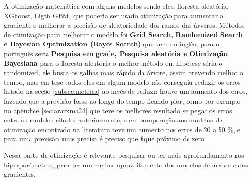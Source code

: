 A otimização matemática com alguns modelos sendo eles, floresta aleatória, XGboost, Ligth GBM, que poderia ser usado otimização para aumentar o gradiente e melhorar a precisão de aleatoriedade dos ramos das árvores. Métodos de otimização para melhorar o modelo foi \textbf{Grid Search, Randomized Search e Bayesian Optimization (Bayes Search)}  que vem do inglês, para o português seria \textbf{Pesquisa em grade, Pesquisa aleatória e Otimização Bayesiana} para o floresta aleatória o melhor método em hipótese séria o randomized, ele busca os galhos mais rápido da árvore, assim prevendo melhor o tempo, mas em tese todos eles em algum modelo não conseguiu reduzir os erros listado na seção \ref{subsec:metrica} ao invés de reduzir houve um aumento dos erros, fazendo que a previsão fosse ao longo do tempo ficando pior, como por exemplo no apêndice \ref{sec:ararxma24} que teve os melhores resultado se pegar os erros entre os modelos citados anteriormente, e em comparação aos modelos de otimização encontrado na literatura teve um aumento nos erros de 20 a 50 \%, e para uma previsão mais precisa é preciso que fique próximo de zero.

Nessa parte da otimização é relevante pesquisar ou ter mais aprofundamento nos hiperparâmetros, para ter um melhor aproveitamento dos modelos de árvore e dos gradientes. 